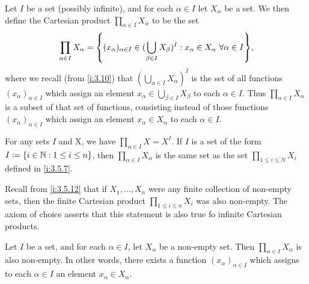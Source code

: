 \begin{defn}\label{i:8.4.1}
  Let \(I\) be a set (possibly infinite), and for each \(\alpha \in I\) let \(X_{\alpha}\) be a set.
  We then define the Cartesian product \(\prod_{\alpha \in I} X_{\alpha}\) to be the set
  \[
    \prod_{\alpha \in I} X_{\alpha} = \set{(x_{\alpha})_{\alpha \in I} \in (\bigcup_{\beta \in I} X_{\beta})^I : x_{\alpha} \in X_{\alpha} \ \forall \alpha \in I},
  \]
  where we recall (from \cref{i:3.10}) that \((\bigcup_{\alpha \in I} X_{\alpha})^I\) is the set of all functions \((x_{\alpha})_{\alpha \in I}\) which assign an element \(x_{\alpha} \in \bigcup_{\beta \in I} X_{\beta}\) to each \(\alpha \in I\).
  Thus \(\prod_{\alpha \in I} X_{\alpha}\) is a subset of that set of functions, consisting instead of those functions \((x_{\alpha})_{\alpha \in I}\) which assign an element \(x_{\alpha} \in X_{\alpha}\) to each \(\alpha \in I\).
\end{defn}

\begin{eg}\label{i:8.4.2}
  For any sets \(I\) and X, we have \(\prod_{\alpha \in I} X = X^I\).
  If \(I\) is a set of the form \(I \coloneqq \left\lbrace i \in \mathbb{N} : 1 \leq i \leq n\right\rbrace\), then \(\prod_{\alpha \in I} X_{\alpha}\) is the same set as the set \(\prod_{1 \leq i \leq N} X_i\) defined in \cref{i:3.5.7}.
\end{eg}

\begin{note}
  Recall from \cref{i:3.5.12} that if \(X_1, \dots, X_n\) were any finite collection of non-empty sets, then the finite Cartesian product \(\prod_{1 \leq i \leq n} X_i\) was also non-empty.
  The axiom of choice asserts that this statement is also true fo infinite Cartesian products.
\end{note}

\begin{ax}[Choice]\label{i:8.1}
  Let \(I\) be a set, and for each \(\alpha \in I\), let \(X_{\alpha}\) be a non-empty set.
  Then \(\prod_{\alpha \in I} X_{\alpha}\) is also non-empty.
  In other words, there exists a function \((x_{\alpha})_{\alpha \in I}\) which assigns to each \(\alpha \in I\) an element \(x_{\alpha} \in X_{\alpha}\).
\end{ax}

